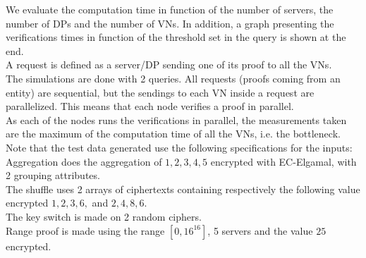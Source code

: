 \documentclass{article}
\begin{document}
We evaluate the computation time in function of the number of servers, the number of DPs and the number of VNs. In addition, a graph presenting the verifications times in function of the threshold set in the query is shown at the end.\\
A request is defined as a server/DP sending one of its proof to all the VNs.\\
The simulations are done with 2 queries. All requests (proofs coming from an entity) are sequential, but the sendings to each VN inside a request are parallelized. This means that each node verifies a proof in parallel.\\
As each of the nodes runs the verifications in parallel, the measurements taken are the maximum of the computation time of all the VNs, i.e. the bottleneck.\\


Note that the test data generated use the following specifications for the inputs:\\
Aggregation does the aggregation of $1,2,3,4,5$ encrypted with EC-Elgamal, with 2 grouping attributes.\\
The shuffle uses 2 arrays of ciphertexts containing respectively the following value encrypted $1,2,3,6,$ and $2,4,8,6$. \\
The key switch is made on 2 random ciphers.\\
Range proof is made using the range $[0,16^{16}]$, 5 servers and the value $25$ encrypted.
\end{document}
